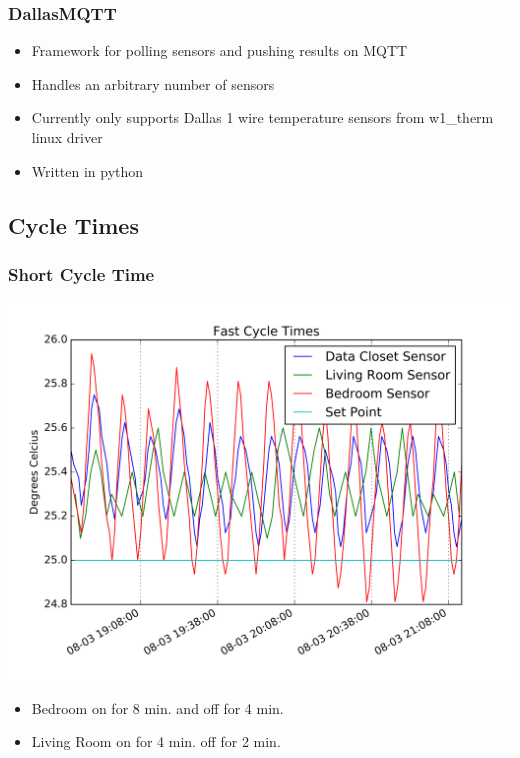 \documentclass[aspectratio=169,11pt,hyperref={colorlinks=true}]{beamer}
\begin{document}
\begin{frame}
    \frametitle{DallasMQTT}
    \begin{itemize}
        \item Framework for polling sensors and pushing results on MQTT
        \item Handles an arbitrary number of sensors
        \item Currently only supports Dallas 1 wire temperature sensors from w1\_therm linux driver
        \item Written in python
    \end{itemize}
\end{frame}

\subsection{Cycle Times}
\begin{frame}
    \frametitle{Short Cycle Time}
    \begin{center}
        \includegraphics[height=.75\textheight]{short_cycle.png}
    \end{center}
    \begin{itemize}
        \item Bedroom on for 8 min. and off for 4 min.
        \item Living Room on for 4 min. off for 2 min.
    \end{itemize}
\end{frame}
\end{document}
